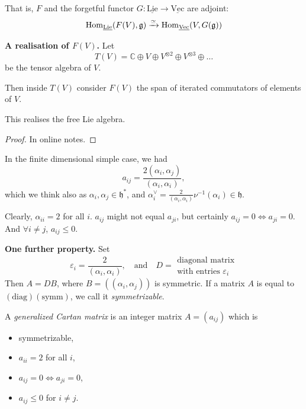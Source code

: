 That is, $F$ and the 
forgetful functor $G:\underline{\text{Lie}}\to \underline{\text{Vec}}$
are adjoint:
$$
\mathop{\mathrm{Hom}}\nolimits_{\underline{\text{Lie}}}(F(V),\mathfrak{g})
\xrightarrow{\simeq }
\mathop{\mathrm{Hom}}\nolimits_{\underline{\text{Vec}}}(V,G(\mathfrak{g}))
$$

\medskip\noindent
{\bf A realisation of $F(V)$.} Let 
$$
T(V)=\mathbb{C} \oplus V \oplus V^{\otimes 2}\oplus V^{\otimes 3}\oplus\ldots
$$
be the tensor algebra of $V$. 

Then inside $T(V)$ consider $F(V)$ the span of iterated commutators of elements
of  $V$.

\begin{proposition}
\label{proposition-this-realises-the-free-Lie-algebra}
This realises the free Lie algebra.
\end{proposition}

\begin{proof}
In online notes.
\end{proof}

\medskip\noindent
In the finite dimensional simple case, we had
$$
a_{ij}=\frac{2(\alpha_i,\alpha_j)}{(\alpha_i,\alpha_i)},
$$
which we think also as $\alpha_i,\alpha_j \in \mathfrak{h}^*$, 
and $\alpha_i^\vee=\frac{2}{(\alpha_i,\alpha_i)}\nu^{-1}(\alpha_i) 
\in \mathfrak{h}.$

Clearly, $\alpha_{ii}=2$ for all $i$. 
$a_{ij}$ might not equal $a_{ji}$, but certainly $a_{ij}=0 \iff a_{ji}=0$. 
And $\forall  i \neq j$, $a_{ij} \leq 0$.

\medskip\noindent
{\bf One further property.} Set
$$
\varepsilon_i=\frac{2}{(\alpha_i,\alpha_i)},\quad \text{and}\quad 
D=\substack{\text{diagonal matrix} \\ \text{with entries }\varepsilon_i}
$$
Then $A=DB$, where $B=((\alpha_i,\alpha_j))$ is symmetric. 
If a matrix $A$ is equal to $(\text{diag})(\text{symm})$, we call it
 {\it symmetrizable}.

\begin{definition}
\label{definition-generalized-Cartan-matrix}
A {\it generalized Cartan matrix} is an integer matrix $A=(a_{ij})$ 
which is
\begin{itemize}
\item symmetrizable,
\item $a_{ii}=2$ for all $i$,
\item $a_{ij}=0 \iff a_{ji}=0$,
\item $a_{ij}\leq 0$ for $i \neq j$.
\end{itemize}
\end{definition}

